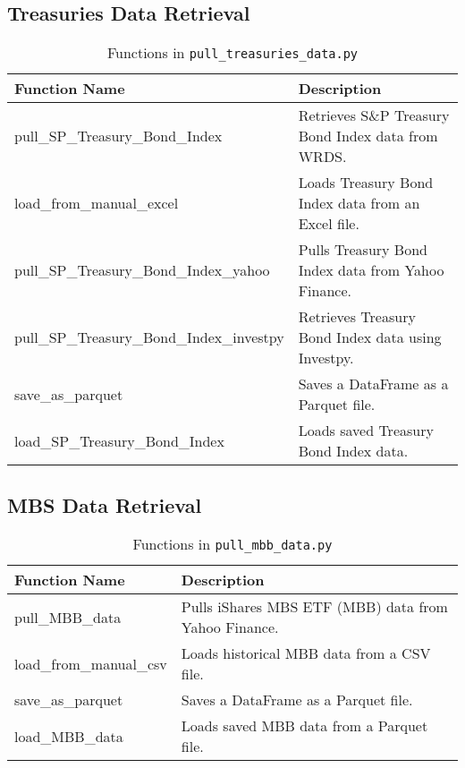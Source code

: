 \documentclass{article}
\begin{document}
\subsection{Treasuries Data Retrieval}
\begin{table}[H]
    \centering
    \caption{Functions in \texttt{pull\_treasuries\_data.py}}
    \begin{tabular}{|l|p{10cm}|}
        \hline
        \textbf{Function Name} & \textbf{Description} \\
        \hline
        pull\_SP\_Treasury\_Bond\_Index & Retrieves S\&P Treasury Bond Index data from WRDS. \\
        \hline
        load\_from\_manual\_excel & Loads Treasury Bond Index data from an Excel file. \\
        \hline
        pull\_SP\_Treasury\_Bond\_Index\_yahoo & Pulls Treasury Bond Index data from Yahoo Finance. \\
        \hline
        pull\_SP\_Treasury\_Bond\_Index\_investpy & Retrieves Treasury Bond Index data using Investpy. \\
        \hline
        save\_as\_parquet & Saves a DataFrame as a Parquet file. \\
        \hline
        load\_SP\_Treasury\_Bond\_Index & Loads saved Treasury Bond Index data. \\
        \hline
    \end{tabular}
\end{table}

\subsection{MBS Data Retrieval}
\begin{table}[H]
    \centering
    \caption{Functions in \texttt{pull\_mbb\_data.py}}
    \begin{tabular}{|l|p{10cm}|}
        \hline
        \textbf{Function Name} & \textbf{Description} \\
        \hline
        pull\_MBB\_data & Pulls iShares MBS ETF (MBB) data from Yahoo Finance. \\
        \hline
        load\_from\_manual\_csv & Loads historical MBB data from a CSV file. \\
        \hline
        save\_as\_parquet & Saves a DataFrame as a Parquet file. \\
        \hline
        load\_MBB\_data & Loads saved MBB data from a Parquet file. \\
        \hline
    \end{tabular}
\end{table}
\end{document}
